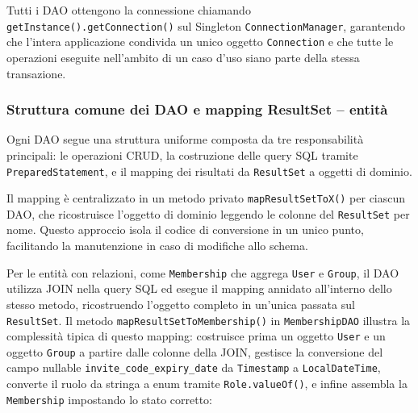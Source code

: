 Tutti i DAO ottengono la connessione chiamando 
\texttt{getInstance().getConnection()} sul Singleton 
\texttt{ConnectionManager}, garantendo che l'intera
applicazione condivida un unico oggetto \texttt{Connection} e che tutte le
operazioni eseguite nell'ambito di un caso d'uso siano parte della stessa
transazione.

\subsubsection{Struttura comune dei DAO e mapping ResultSet -- entità}

Ogni DAO segue una struttura uniforme composta da tre responsabilità principali:
le operazioni CRUD, la costruzione delle query SQL tramite
\texttt{PreparedStatement}, e il mapping dei risultati da \texttt{ResultSet} a
oggetti di dominio.

Il mapping è centralizzato in un metodo privato \texttt{mapResultSetToX()} per
ciascun DAO, che ricostruisce l'oggetto di dominio leggendo le colonne del
\texttt{ResultSet} per nome. Questo approccio isola il codice di conversione in un
unico punto, facilitando la manutenzione in caso di modifiche allo schema.

Per le entità con relazioni, come \texttt{Membership} che aggrega \texttt{User} e
\texttt{Group}, il DAO utilizza JOIN nella query SQL ed esegue il mapping annidato
all'interno dello stesso metodo, ricostruendo l'oggetto completo in un'unica
passata sul \texttt{ResultSet}. Il metodo \texttt{mapResultSetToMembership()} in
\texttt{MembershipDAO} illustra la complessità tipica di questo mapping: costruisce
prima un oggetto \texttt{User} e un oggetto \texttt{Group} a partire dalle colonne
della JOIN, gestisce la conversione del campo nullable
\texttt{invite\_code\_expiry\_date} da \texttt{Timestamp} a \texttt{LocalDateTime},
converte il ruolo da stringa a enum tramite \texttt{Role.valueOf()}, e infine
assembla la \texttt{Membership} impostando lo stato corretto:

